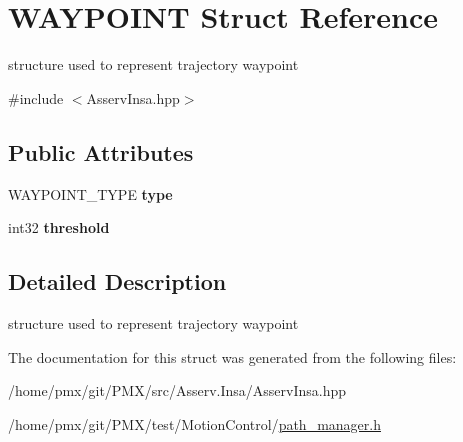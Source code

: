 \hypertarget{structWAYPOINT}{}\section{W\+A\+Y\+P\+O\+I\+NT Struct Reference}
\label{structWAYPOINT}


structure used to represent trajectory waypoint  




{\ttfamily \#include $<$Asserv\+Insa.\+hpp$>$}

\subsection*{Public Attributes}
\begin{DoxyCompactItemize}
\item 
\mbox{\label{structWAYPOINT_a06c9b1d7cb338a5a987a2f3839271262}} 
W\+A\+Y\+P\+O\+I\+N\+T\+\_\+\+T\+Y\+PE {\bfseries type}
\item 
\mbox{\label{structWAYPOINT_a14eb59f999d038e098ceb4fb3fe096d5}} 
int32 {\bfseries threshold}
\end{DoxyCompactItemize}


\subsection{Detailed Description}
structure used to represent trajectory waypoint 

The documentation for this struct was generated from the following files\+:\begin{DoxyCompactItemize}
\item 
/home/pmx/git/\+P\+M\+X/src/\+Asserv.\+Insa/Asserv\+Insa.\+hpp\item 
/home/pmx/git/\+P\+M\+X/test/\+Motion\+Control/\hyperlink{path__manager_8h}{path\+\_\+manager.\+h}\end{DoxyCompactItemize}
